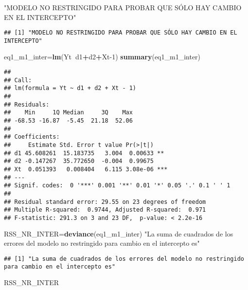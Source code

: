 \documentclass[
]{article}
\newenvironment{Shaded}{\begin{snugshade}}{\end{snugshade}}
\newcommand{\DecValTok}[1]{\textcolor[rgb]{0.00,0.00,0.81}{#1}}
\newcommand{\KeywordTok}[1]{\textcolor[rgb]{0.13,0.29,0.53}{\textbf{#1}}}
\newcommand{\NormalTok}[1]{#1}
\newcommand{\OperatorTok}[1]{\textcolor[rgb]{0.81,0.36,0.00}{\textbf{#1}}}
\newcommand{\StringTok}[1]{\textcolor[rgb]{0.31,0.60,0.02}{#1}}
\begin{document}
\begin{Shaded}
\begin{Highlighting}[]
\StringTok{"MODELO NO RESTRINGIDO PARA PROBAR QUE SÓLO HAY CAMBIO EN EL INTERCEPTO"}
\end{Highlighting}
\end{Shaded}

\begin{verbatim}
## [1] "MODELO NO RESTRINGIDO PARA PROBAR QUE SÓLO HAY CAMBIO EN EL INTERCEPTO"
\end{verbatim}

\begin{Shaded}
\begin{Highlighting}[]
\NormalTok{eq1_m1_inter=}\KeywordTok{lm}\NormalTok{(Yt}\OperatorTok{~}\NormalTok{d1}\OperatorTok{+}\NormalTok{d2}\OperatorTok{+}\NormalTok{Xt}\DecValTok{-1}\NormalTok{)}
\KeywordTok{summary}\NormalTok{(eq1_m1_inter)}
\end{Highlighting}
\end{Shaded}

\begin{verbatim}
## 
## Call:
## lm(formula = Yt ~ d1 + d2 + Xt - 1)
## 
## Residuals:
##    Min     1Q Median     3Q    Max 
## -68.53 -16.87  -5.45  21.18  52.06 
## 
## Coefficients:
##     Estimate Std. Error t value Pr(>|t|)    
## d1 45.608261  15.183735   3.004  0.00633 ** 
## d2 -0.147267  35.772650  -0.004  0.99675    
## Xt  0.051393   0.008404   6.115 3.08e-06 ***
## ---
## Signif. codes:  0 '***' 0.001 '**' 0.01 '*' 0.05 '.' 0.1 ' ' 1
## 
## Residual standard error: 29.55 on 23 degrees of freedom
## Multiple R-squared:  0.9744, Adjusted R-squared:  0.971 
## F-statistic: 291.3 on 3 and 23 DF,  p-value: < 2.2e-16
\end{verbatim}

\begin{Shaded}
\begin{Highlighting}[]
\NormalTok{RSS_NR_INTER=}\KeywordTok{deviance}\NormalTok{(eq1_m1_inter)}
\StringTok{"La suma de cuadrados de los errores del modelo no restringido para cambio en el intercepto es"}
\end{Highlighting}
\end{Shaded}

\begin{verbatim}
## [1] "La suma de cuadrados de los errores del modelo no restringido para cambio en el intercepto es"
\end{verbatim}

\begin{Shaded}
\begin{Highlighting}[]
\NormalTok{RSS_NR_INTER}
\end{Highlighting}
\end{Shaded}
\end{document}
